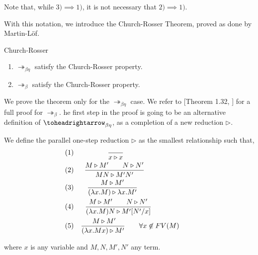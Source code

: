 \begin{remark} 
  Note that, while $3)\implies 1)$, it is not necessary that $2)\implies 1)$.
\end{remark}


With this notation, we introduce the Church-Rosser Theorem, proved as done by Martin-Löf.

\begin{theorem}{Church-Rosser}\label{theo:church-rosser}
  \begin{enumerate}
  \item $\twoheadrightarrow_{\beta\eta}$ satisfy the Church-Rosser property.
  \item $\twoheadrightarrow_{\beta}$ satisfy the Church-Rosser property.
  \end{enumerate}
\end{theorem}




We prove the theorem only for the $ \twoheadrightarrow_{\beta\eta}$ case. We refer to [Theorem 1.32, \cite{hindley2008lambda}] for a full proof for $\twoheadrightarrow_\beta$. he first step in the proof is going to be an alternative definition of $\toheadrightarrow_{\beta\eta}$, as a completion of a new reduction $\triangleright$.
\begin{definition}
  We define the parallel one-step reduction  $\triangleright$ as the smallest relationship such that,\\
\begin{align*}
(1)&& {\displaystyle \over x \triangleright x}\qquad\qquad\qquad\qquad\qquad\\
 (2)&& { M \triangleright M'\qquad N\triangleright N'  \over MN \triangleright M'N' }\qquad\qquad\qquad\ \  \ \\
 (3)&&{M \triangleright M' \over(\lambda x.M) \triangleright \lambda x.M'}\qquad\qquad\qquad\qquad\\
 (4)&& {M \triangleright M'\qquad N \triangleright N' \over (\lambda x.M)N \triangleright M'[N'/x]}\qquad\qquad\qquad\\
  (5)&& {\ M\triangleright M'\over(\lambda x.Mx) \triangleright M'} \qquad \forall x \not  \in FV(M)\qquad
\end{align*}



where $x$ is any variable and $M,N,M',N'$ any term.
\end{definition}

